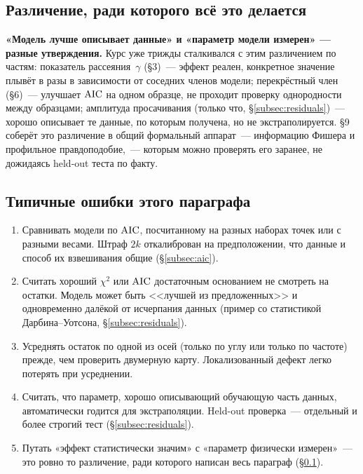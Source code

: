 \subsection{Различение, ради которого всё это делается}
\label{subsec:distinction}

\begin{tcolorbox}[enhanced,colback=cS1!7,colframe=cS1,boxrule=0pt,leftrule=3pt,arc=1pt]
\textbf{«Модель лучше описывает данные» и «параметр модели измерен» — разные утверждения.} Курс
уже трижды сталкивался с этим различением по частям: показатель рассеяния~$\gamma$ (§3)~---
эффект реален, конкретное значение плывёт в разы в зависимости от соседних членов модели;
перекрёстный член (§6)~--- улучшает $\operatorname{AIC}$ на одном образце, не проходит проверку однородности
между образцами; амплитуда просачивания (только что, §\ref{subsec:residuals})~--- хорошо описывает
те данные, по которым получена, но не экстраполируется. §9 соберёт это различение в общий
формальный аппарат~--- информацию Фишера и профильное правдоподобие,~--- которым можно проверять
его заранее, не дожидаясь held-out теста по факту.
\end{tcolorbox}

\subsection{Типичные ошибки этого параграфа}

\begin{enumerate}[leftmargin=1.6em,itemsep=0.25em]
  \item Сравнивать модели по $\operatorname{AIC}$, посчитанному на разных наборах точек или с разными весами.
        Штраф $2k$ откалиброван на предположении, что данные и способ их взвешивания общие
        (§\ref{subsec:aic}).
  \item Считать хороший $\chi^2$ или $\operatorname{AIC}$ достаточным основанием не смотреть на остатки. Модель
        может быть <<лучшей из предложенных>> и одновременно далёкой от исчерпания данных
        (пример со статистикой Дарбина--Уотсона, §\ref{subsec:residuals}).
  \item Усреднять остаток по одной из осей (только по углу или только по частоте) прежде, чем
        проверить двумерную карту. Локализованный дефект легко потерять при усреднении.
  \item Считать, что параметр, хорошо описывающий обучающую часть данных, автоматически годится
        для экстраполяции. Held-out проверка~--- отдельный и более строгий тест
        (§\ref{subsec:residuals}).
  \item Путать «эффект статистически значим» с «параметр физически измерен»~--- это ровно то
        различение, ради которого написан весь параграф (§\ref{subsec:distinction}).
\end{enumerate}

\clearpage
